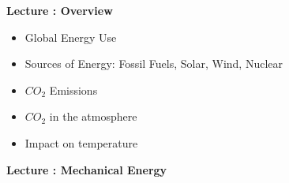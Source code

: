 \documentclass[11pt]{book}
\begin{document}
\newcommand{\Sfigr}[2]{
   \begin{figure}[thbp]
   \begin{center}
    \sfigr{Figures/#1.pdf}{0.6\columnwidth}
    \caption{{\small #2}}
    \label{fig:#1}
     \end{center}
   \end{figure}
}

\newcommand\dirac{\delta_D}
\newcommand{\rf}[1]{\ref{fig:#1}}
\newcommand\example[1]{{\tt EXAMPLE: #1}}
\newcommand\exercise[1]{{\bf EXERCISE: #1}}
\newcommand\comment[1]{\fbox{ \parbox{\linewidth} {\bf
Comment: #1
		}
}
}
\newcommand\expect[1]{{\tt {\bf Back of the Envelope:} #1}}
\newcommand\theorem[1]{{\tt Theorem: #1}}
\newcommand\bei{\begin{itemize}}
\newcommand\eei{\end{itemize}}
\newcommand\bee{\begin{enumerate}}
\newcommand\eee{\end{enumerate}}
\newcommand\lecture[1]{\newpage
\addtocounter{lectureno}{1}
\setcounter{secno}{0}
\begin{center}
 {\bf Lecture \arabic{lectureno}: #1}
\end{center}
}
\newcommand\conversion[1]{\fbox{#1}}
\newcommand\homework[1]{{\tt HW for Lecture \arabic{lectureno}:} #1}

\newcommand\lsection[1]{
\addtocounter{secno}{1}
{\bf {}.\alph{secno} #1:}}

\lecture{Overview}

\bei
\item Global Energy Use
\item Sources of Energy: Fossil Fuels, Solar, Wind, Nuclear
\item $CO_2$ Emissions
\item $CO_2$ in the atmosphere
\item Impact on temperature
\eei

\lecture{Mechanical Energy}
\end{document}
